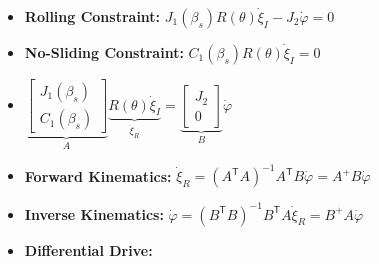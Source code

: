 \documentclass[a4paper]{article}
\newcommand{\ides}[1]{\item \textbf{#1}}
\newcommand{\transpose}{\mathsf{T}}
\begin{document}
\begin{itemize}
    \ides{Rolling Constraint:} $J_1(\beta_s) R(\theta) \dot \xi_I - J_2 \dot \varphi = 0$
    \ides{No-Sliding Constraint:} $C_1(\beta_s) R(\theta) \dot \xi_I = 0$
    \item $
        \underbrace{\begin{bmatrix}
            J_1(\beta_s)\\
            C_1(\beta_s)
        \end{bmatrix}}_{A} \underbrace{R(\theta) \dot \xi_I}_{\dot \xi_R} =
        \underbrace{\begin{bmatrix}
            J_2\\
            0
        \end{bmatrix}}_{B} \dot \varphi$
    \ides{Forward Kinematics:} $\dot \xi_R = (A^\transpose A)^{-1} A^\transpose B \dot \varphi = A^+ B \dot \varphi$
    \ides{Inverse Kinematics:} $\dot \varphi = (B^\transpose B)^{-1} B^\transpose A \dot \xi_R = B^+ A \dot \varphi$
    \ides{Differential Drive:}
\end{itemize}
\end{document}
